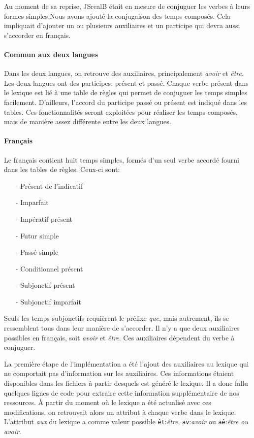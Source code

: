 \documentclass[11pt]{article} %
\newcommand{\system}[1]{\textsf{#1}}
\newcommand{\JSB}{\system{JSrealB}}
\begin{document}
Au moment de sa reprise, \JSB{} était en mesure de conjuguer les
verbes à leurs formes simples.Nous avons ajouté la conjugaison des temps composés.
Cela impliquait d'ajouter un ou plusieurs auxiliaires et un participe qui devra
aussi s'accorder en français.

\paragraph{Commun aux deux langues}

Dans les deux langues, on retrouve des auxiliaires, principalement 
\emph{avoir} et \emph{être}. Les deux langues ont des participes: 
présent et passé. Chaque verbe présent dans le lexique est 
lié à une table de règles qui 
permet de conjuguer les temps simples facilement. D'ailleurs, l'accord 
du participe passé ou présent est indiqué dans les tables. Ces fonctionnalités 
seront exploitées pour réaliser les temps composés, mais de manière assez 
différente entre les deux langues.

\paragraph{Français}

Le français contient huit temps simples, formés d'un seul verbe accordé fourni
dans les tables de règles. Ceux-ci sont:
\begin{itemize}
\item[-] Présent de l'indicatif
\item[-] Imparfait
\item[-] Impératif présent
\item[-] Futur simple
\item[-] Passé simple
\item[-] Conditionnel présent
\item[-] Subjonctif présent
\item[-] Subjonctif imparfait
\end{itemize}
Seuls les temps subjonctifs requièrent le préfixe \emph{que}, 
mais autrement, ils se ressemblent tous dans leur manière de s'accorder. Il n'y 
a que deux auxiliaires possibles en français, soit \emph{avoir} et \emph{être}.
Ces auxiliaires dépendent du verbe à conjuguer.

La première étape de l'implémentation
a été l'ajout des auxiliaires au lexique qui ne comportait pas
d'information sur les auxiliaires. Ces informations
étaient disponibles dans les fichiers à partir desquels est généré
le lexique. Il a donc fallu quelques lignes de code pour extraire
cette information supplémentaire de nos ressources. À partir du moment
où le lexique a été actualisé avec ces modifications, on retrouvait
alors un attribut à chaque verbe dans le lexique. L'attribut \emph{aux
}du lexique a comme valeur possible \texttt{êt}:\emph{être}, \texttt{av}:\emph{avoir}
ou \texttt{aê}:\emph{être ou avoir}.
\end{document}
